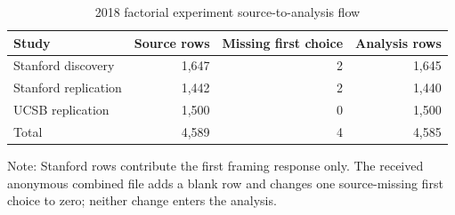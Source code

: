\begin{table}[H]
\centering
\caption{\label{tab:protzko-flow}2018 factorial experiment source-to-analysis flow}
\centering
\begin{threeparttable}
\begin{tabular}[t]{lrrr}
\toprule
Study & Source rows & Missing first choice & Analysis rows\\
\midrule
Stanford discovery & 1,647 & 2 & 1,645\\
Stanford replication & 1,442 & 2 & 1,440\\
UCSB replication & 1,500 & 0 & 1,500\\
Total & 4,589 & 4 & 4,585\\
\bottomrule
\end{tabular}
\begin{tablenotes}[para]
\item Note: Stanford rows contribute the first framing response only. The received anonymous combined file adds a blank row and changes one source-missing first choice to zero; neither change enters the analysis.
\end{tablenotes}
\end{threeparttable}
\end{table}
